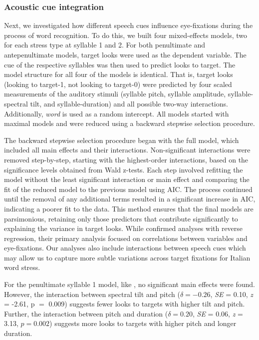 \subsubsection{Acoustic cue integration}

Next, we investigated how different speech cues influence eye-fixations during the process of word recognition. To do this, we built four mixed-effects models, two for each stress type at syllable 1 and 2. For both penultimate and antepenultimate models, target looks were used as the dependent variable. The cue of the respective syllables was then used to predict looks to target. The model structure for all four of the models is identical. That is, target looks (looking to target-1, not looking to target-0) were predicted by four scaled measurements of the auditory stimuli (syllable pitch, syllable amplitude, syllable-spectral tilt, and syllable-duration) and all possible two-way interactions. Additionally, \textit{word} is used as a random intercept. All models started with maximal models and were reduced using a backward stepwise selection procedure. 

The backward stepwise selection procedure began with the full model, which included all main effects and their interactions. Non-significant interactions were removed step-by-step, starting with the highest-order interactions, based on the significance levels obtained from Wald z-tests. Each step involved refitting the model without the least significant interaction or main effect and comparing the fit of the reduced model to the previous model using AIC. The process continued until the removal of any additional terms resulted in a significant increase in AIC, indicating a poorer fit to the data. This method ensures that the final models are parsimonious, retaining only those predictors that contribute significantly to explaining the variance in target looks. While \cite{Sulpizio_McQueen_2012} confirmed analyses with reverse regression, their primary analysis focused on correlations between variables and eye-fixations. Our analyses also include interactions between speech cues which may allow us to capture more subtle variations across target fixations for Italian word stress.

For the penultimate syllable 1 model, like \cite{Sulpizio_McQueen_2012}, no significant main effects were found. However, the interaction between spectral tilt and pitch ($\delta = -0.26$, \textit{SE} = 0.10, \textit{z} = -2.61, p $=$ 0.009) suggests fewer looks to targets with higher tilt and pitch. Further, the interaction between pitch and duration ($\delta = 0.20$, \textit{SE} = 0.06, \textit{z} = 3.13, $p = 0.002$) suggests more looks to targets with higher pitch and longer duration.

